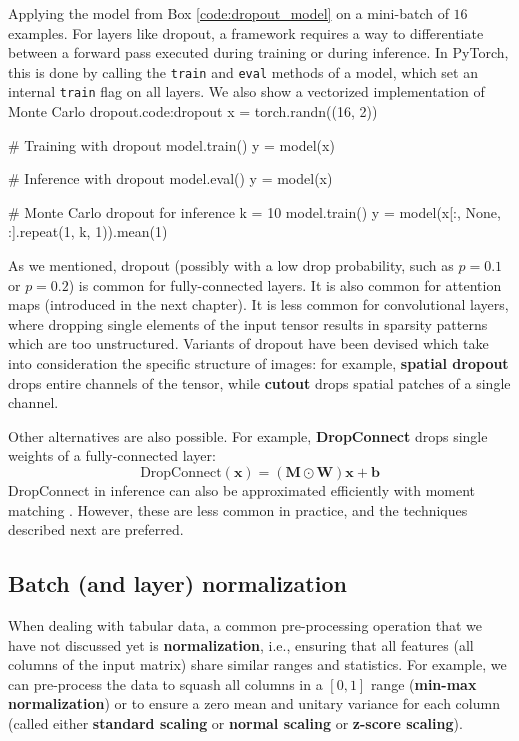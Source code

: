 \begin{mypy}{Applying the model from Box \ref{code:dropout_model} on a mini-batch of $16$ examples. For layers like dropout, a framework requires a way to differentiate between a  forward pass executed during training or during inference. In PyTorch, this is done by calling the {\footnotesize\texttt{train}} and {\footnotesize\texttt{eval}} methods of a model, which set an internal {\footnotesize\texttt{train}} flag on all layers. We also show a vectorized implementation of Monte Carlo dropout.}{code:dropout}
x = torch.randn((16, 2))

# Training with dropout
model.train()
y = model(x)

# Inference with dropout
model.eval()
y = model(x)

# Monte Carlo dropout for inference
k = 10
model.train()
y = model(x[:, None, :].repeat(1, k, 1)).mean(1)
\end{mypy}

As we mentioned, dropout (possibly with a low drop probability, such as $p=0.1$ or $p=0.2$) is common for fully-connected layers. It is also common for attention maps (introduced in the next chapter). It is less common for convolutional layers, where dropping single elements of the input tensor results in sparsity patterns which are too unstructured. Variants of dropout have been devised which take into consideration the specific structure of images: for example, \textbf{spatial dropout} \cite{tompson2015efficient} drops entire channels of the tensor, while \textbf{cutout} \cite{devries2017improved} drops spatial patches of a single channel.

Other alternatives are also possible. For example, \textbf{DropConnect} \cite{wan2013regularization} drops single weights of a fully-connected layer:
%
$$
\text{DropConnect}(\mathbf{x})=(\mathbf{M}\odot\mathbf{W})\mathbf{x}+\mathbf{b}
$$
%
DropConnect in inference can also be approximated efficiently with moment matching \cite{wan2013regularization}. However, these are less common in practice, and the techniques described next are preferred.

\subsection{Batch (and layer) normalization} \addclock

When dealing with tabular data, a common pre-processing operation that we have not discussed yet is \textbf{normalization}, i.e., ensuring that all features (all columns of the input matrix) share similar ranges and statistics. For example, we can pre-process the data to squash all columns in a $[0,1]$ range (\textbf{min-max normalization}) or to ensure a zero mean and unitary variance for each column (called either \textbf{standard scaling} or \textbf{normal scaling} or \textbf{z-score scaling}).

